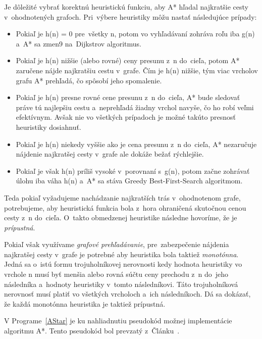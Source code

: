 \bigskip

Je dôležité vybrať korektnú heuristickú funkciu, aby A* hľadal najkratšie cesty v~ohodnotených grafoch. Pri~výbere heuristiky môžu nastať následujúce prípady:
\begin{itemize}
    \item Pokiaľ je h(n) = 0 pre~všetky n, potom vo vyhľadávaní zohráva roľu iba g(n) a~A* sa zmen9 na~Dijkstrov algoritmus.
    \item Pokiaľ je h(n) nižšie (alebo rovné) ceny presunu z~n do~cieľa, potom A* zaručene nájde najkratšiu cestu v~grafe. Čím je h(n) nižšie, tým viac vrcholov grafu A* prehľadá, čo spôsobí jeho spomalenie.
    \item Pokiaľ je h(n) presne rovné cene presunu z~n do~cieľa, A* bude sledovať práve tú najlepšiu cestu a~neprehľadá žiadny vrchol navyše, čo ho robí veľmi efektívnym. Avšak nie vo všetkých prípadoch je možné takúto presnosť heuristiky dosiahnuť.
    \item Pokiaľ je h(n) niekedy vyššie ako je cena presunu z~n do~cieľa, A* nezaručuje nájdenie najkratšej cesty v~grafe ale dokáže bežať rýchlejšie.
    \item Pokiaľ je však h(n) príliš vysoké v~porovnaní s~g(n), potom začne zohrávať úlohu iba váha h(n) a~A* sa stáva Greedy Best-First-Search algoritmom.
\end{itemize}

Teda pokiaľ vyžadujeme nachádzanie najkratších trás v~ohodnotenom grafe, potrebujeme, aby heuristická funkcia bola z~hora ohraničená skutočnou cenou cesty z~n do~cieľa. O~takto obmedzenej heuristike následne hovoríme, že je \textit{prípustná}.

Pokiaľ však využívame \textit{grafové prehľadávanie}, pre~zabezpečenie nájdenia najkratšej cesty v~grafe je potrebné aby heuristika bola taktiež \textit{monotónna}. Jedná sa o~istú formu trojuholníkovej nerovnosti kedy hodnota heuristiky vo vrchole n musí byť menšia alebo rovná súčtu ceny prechodu z~n do~jeho následníka a~hodnoty heuristiky v~tomto následníkovi. Táto trojuholníková nerovnosť musí platiť vo všetkých vrcholoch a~ich následníkoch. Dá sa dokázať, že každá monotónna heuristika je taktiež prípustná.

\bigskip

V Programe~\ref{AStar} je ku nahliadnutiu pseudokód možnej implementácie algoritmu A*. Tento pseudokód bol prevzatý z~Článku~\cite{AStarWiki}.

